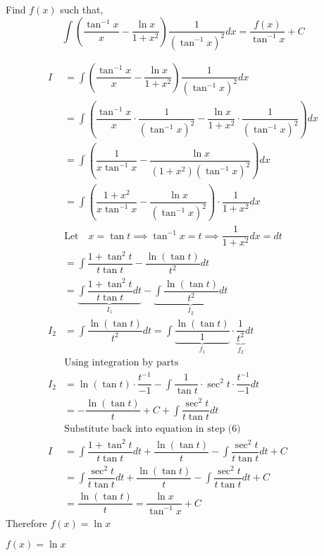 

\question[5] Find $f(x)$ such that,
    \[\int \left(\dfrac{\tan^{-1}x}{x}-\dfrac{\ln x}{1+x^2}\right)\dfrac{1}{(\tan^{-1}x)^2}dx = \dfrac{f(x)}{\tan^{-1}x}+C\]

\begin{solution}[\fullpage]
  \begin{align}
    I &= \int \left(\dfrac{\tan^{-1}x}{x}-\dfrac{\ln x}{1+x^2}\right)\dfrac{1}{(\tan^{-1}x)^2}dx \\
      &= \int \left(\dfrac{\tan^{-1}x}{x}\cdot\dfrac{1}{(\tan^{-1}x)^2}-
                    \dfrac{\ln x}{1+x^2}\cdot\dfrac{1}{(\tan^{-1}x)^2}\right)dx \\
      &= \int \left(\dfrac{1}{x\tan^{-1}x}-\dfrac{\ln x}{(1+x^2)(\tan^{-1}x)^2}\right)dx \\
      &= \int \left(\dfrac{1+x^2}{x\tan^{-1}x}-\dfrac{\ln x}{(\tan^{-1}x)^2}\right)
              \cdot\dfrac{1}{1+x^2}dx \\
      &\text{Let}\quad x=\tan t\implies\tan^{-1}x=t\implies \dfrac{1}{1+x^2}dx=dt \nonumber \\
      &= \int \dfrac{1+\tan^2 t}{t\tan t}-\dfrac{\ln (\tan t)}{t^2}dt \\
      &= \underbrace{\int\dfrac{1+\tan^2 t}{t\tan t}dt}_{I_1}-
         \underbrace{\int\dfrac{\ln (\tan t)}{t^2}dt}_{I_2} \\
    I_2 &= \int\dfrac{\ln (\tan t)}{t^2}dt 
         = \int\underbrace{\dfrac{\ln (\tan t)}{1}}_{f_1}\cdot\underbrace{\dfrac{1}{t^2}}_{f_2}dt \\
        &\text{Using integration by parts} \nonumber \\
    I_2 &= \ln(\tan t)\cdot\dfrac{t^{-1}}{-1} - 
           \int \dfrac{1}{\tan t}\cdot\sec^{2}t\cdot\dfrac{t^{-1}}{-1}dt \\
        &= -\dfrac{\ln(\tan t)}{t} + C + \int \dfrac{\sec^{2}t}{t\tan t}dt \\
        &\text{Substitute back into equation in step (6)} \nonumber \\
    I &= \int\dfrac{1+\tan^2 t}{t\tan t}dt + \dfrac{\ln(\tan t)}{t} - \int \dfrac{\sec^{2}t}{t\tan t}dt + C \\
      &= \int\dfrac{\sec^2 t}{t\tan t}dt + \dfrac{\ln(\tan t)}{t} - \int \dfrac{\sec^{2}t}{t\tan t}dt + C \\
      &= \dfrac{\ln(\tan t)}{t} = \dfrac{\ln x}{\tan^{-1}x} + C
  \end{align}
  Therefore $f(x)=\ln x$
\end{solution}
\ifprintanswers\begin{codex}$f(x)=\ln x$\end{codex}\fi
